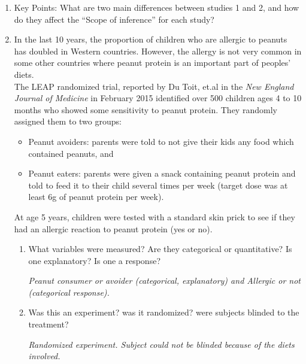\begin{enumerate}
\begin{enumerate}
    \end{enumerate}
  \item Key Points:  What are two main differences between studies 1
    and 2, and how do they affect the ``Scope of inference'' for each
    study? \vfill
  \item In the last 10 years, the proportion of children who are
    allergic to peanuts has doubled in Western countries. However,
    the allergy is  not very common in some other countries where peanut
    protein is an important part of peoples' diets.   \\
     The LEAP randomized trial, reported by  Du Toit, et.al in the
     {\it  New England Journal of  Medicine} in February 2015
     identified over 500 children ages 4 to 10 months who showed some
     sensitivity to peanut protein. They randomly assigned them to two
     groups:
     \begin{itemize}
     \item Peanut avoiders: parents were told to not give their kids
       any food which contained peanuts, and
     \item Peanut eaters: parents were given a snack containing 
       peanut protein and told to feed it to their child several times
       per week (target dose was at least  6g of peanut protein per week).
     \end{itemize}
      At age 5 years, children were tested with a standard skin prick
      to see if they had an allergic reaction to peanut protein (yes
      or no).
      \begin{enumerate}
      \item What variables were measured? 
      Are they categorical or quantitative? Is one explanatory? Is one
      a response?
\begin{students}
        \vfill
\end{students}
\begin{key}
 {\it Peanut consumer or avoider (categorical, explanatory) and
   Allergic or not (categorical response).}
\end{key}

    \item Was this an experiment? was it randomized? were subjects
      blinded to the treatment?
\begin{students}
        \vspace*{\fill}
\end{students}
\begin{key}
 {\it Randomized experiment. Subject could not be blinded because of
   the diets involved.}
\end{key}

      \end{enumerate}

\end{enumerate}